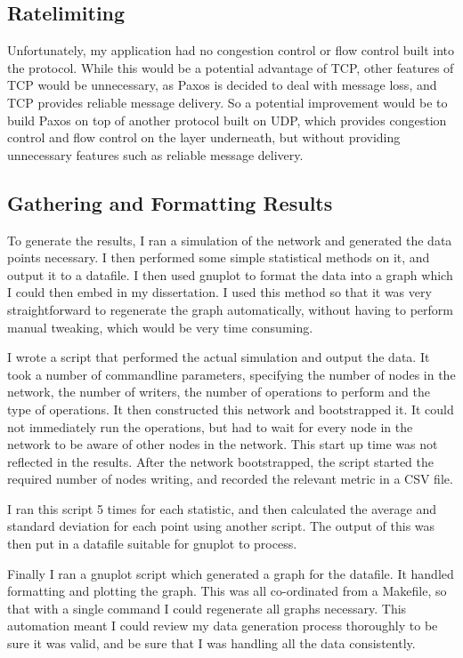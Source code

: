 \documentclass[12pt,twoside,notitlepage]{report}
\begin{document}
\subsection{Ratelimiting}


Unfortunately, my application had no congestion control or flow control built into the protocol.
While this would be a potential advantage of TCP, other features of TCP would be unnecessary, as
Paxos is decided to deal with message loss, and TCP provides reliable message delivery. So a
potential improvement would be to build Paxos on top of another protocol built on UDP, which
provides congestion control and flow control on the layer underneath, but without providing
unnecessary features such as reliable message delivery.

\subsection{Gathering and Formatting Results}

To generate the results, I ran a simulation of the network and generated the data points
necessary. I then performed some simple statistical methods on it, and output it to a datafile. I
then used gnuplot to format the data into a graph which I could then embed in my dissertation. I
used this method so that it was very straightforward to regenerate the graph automatically,
without having to perform manual tweaking, which would be very time consuming.

I wrote a script that performed the actual simulation and output the data. It took a number of
commandline parameters, specifying the number of nodes in the network, the number of writers, the
number of operations to perform and the type of operations. It then constructed this network and
bootstrapped it. It could not immediately run the operations, but had to wait for every node in
the network to be aware of other nodes in the network. This start up time was not reflected in the
results. After the network bootstrapped, the script started the required number of nodes writing,
and recorded the relevant metric in a CSV file.

I ran this script 5 times for each statistic, and then calculated the average and standard
deviation for each point using another script. The output of this was then put in a datafile
suitable for gnuplot to process.

Finally I ran a gnuplot script which generated a graph for the datafile. It handled formatting and
plotting the graph. This was all co-ordinated from a Makefile, so that with a single command I
could regenerate all graphs necessary. This automation meant I could review my data generation
process thoroughly to be sure it was valid, and be sure that I was handling all the data
consistently.
\end{document}
